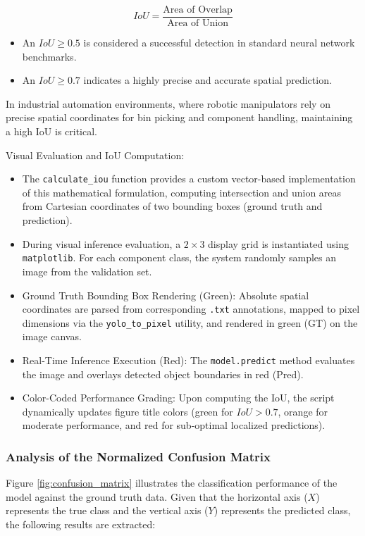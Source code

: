 \documentclass{article}
\begin{document}
$$IoU = \frac{\text{Area of Overlap}}{\text{Area of Union}}$$

\begin{itemize}
	\item An $IoU \ge 0.5$ is considered a successful detection in standard neural network benchmarks.
	\item An $IoU \ge 0.7$ indicates a highly precise and accurate spatial prediction.
\end{itemize}

In industrial automation environments, where robotic manipulators rely on precise spatial coordinates for bin picking and component handling, maintaining a high IoU is critical.

Visual Evaluation and IoU Computation:
\begin{itemize}
	\item The \texttt{calculate\_iou} function provides a custom vector-based implementation of this mathematical formulation, computing intersection and union areas from Cartesian coordinates of two bounding boxes (ground truth and prediction).
	\item During visual inference evaluation, a $2 \times 3$ display grid is instantiated using \texttt{matplotlib}. For each component class, the system randomly samples an image from the validation set.
	\item Ground Truth Bounding Box Rendering (Green): Absolute spatial coordinates are parsed from corresponding \texttt{.txt} annotations, mapped to pixel dimensions via the \texttt{yolo\_to\_pixel} utility, and rendered in green (GT) on the image canvas.
	\item Real-Time Inference Execution (Red): The \texttt{model.predict} method evaluates the image and overlays detected object boundaries in red (Pred).
	\item Color-Coded Performance Grading: Upon computing the IoU, the script dynamically updates figure title colors (green for $IoU > 0.7$, orange for moderate performance, and red for sub-optimal localized predictions).
\end{itemize}


\subsubsection{Analysis of the Normalized Confusion Matrix}

Figure \ref{fig:confusion_matrix} illustrates the classification performance of the model against the ground truth data. Given that the horizontal axis ($X$) represents the true class and the vertical axis ($Y$) represents the predicted class, the following results are extracted:
\end{document}
